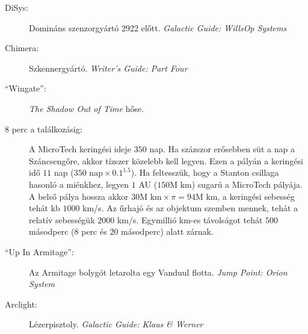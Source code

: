 \documentclass[10pt]{memoir}
\begin{document}
\begin{description}
\item[DiSys:] Domináns szenzorgyártó 2922 előtt. \textit{Galactic Guide:
WillsOp Systems}

\item[Chimera:] Szkennergyártó. \textit{Writer's Guide: Part Four}

\item[``Wingate'':] \textit{The Shadow Out of Time} hőse.

\item[8 perc a találkozásig:] A MicroTech keringési ideje $350$ nap. Ha
százszor erősebben süt a nap a Száncsengőre, akkor tízszer közelebb kell
legyen. Ezen a pályán a keringési idő $11$ nap ($350 \mbox{ nap} \times
0.1^{1.5}$). Ha feltesszük, hogy a Stanton csillaga hasonló a miénkhez, legyen
$1$ AU ($150 \mbox{M km}$) sugarú a MicroTech pályája. A belső pálya hossza
akkor $30 \mbox{M km} \times \pi = 94 \mbox{M km}$, a keringési sebesség tehát
kb $1000$ km/s. Az űrhajó és az objektum szemben mennek, tehát a relatív
sebességük $2000$ km/s. Egymillió km-es távolságot tehát $500$ másodperc ($8$
perc és $20$ másodperc) alatt zárnak.

\item[``Up In Armitage'':] Az Armitage bolygót letarolta egy Vanduul flotta.
\textit{Jump Point: Orion System}

\item[Arclight:] Lézerpisztoly. \textit{Galactic Guide: Klaus \& Werner}
\end{description}

\cleartoverso
\cleartorecto
\end{document}
